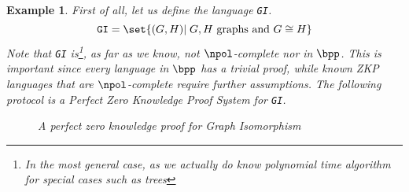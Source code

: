 \documentclass{article}
\newtheorem{example}{Example}
\begin{document}
\begin{example}
    First of all, let us define the language \texttt{GI}.
    \[ \texttt{GI} = \set{ (G, H) | \; G,H \text{ graphs and } G \cong H }\]
    Note that \texttt{GI} is\footnote{In the most general case, as we actually do know polynomial time algorithm for special cases such as trees}, as far as we know, not $\npol$-complete nor in $\bpp$.
    This is important since every language in $\bpp$ has a trivial proof, while known ZKP languages that are $\npol$-complete require further assumptions.
    The following protocol \cite{goldreichFoundationsCryptographyVol2007} is a Perfect Zero Knowledge Proof System for \texttt{GI}.

    \begin{figure}[H]
        \centering
        \caption{A perfect zero knowledge proof for Graph Isomorphism}
        \label{graphisomorphismzkp}
    \end{figure}


\end{example}
\end{document}
